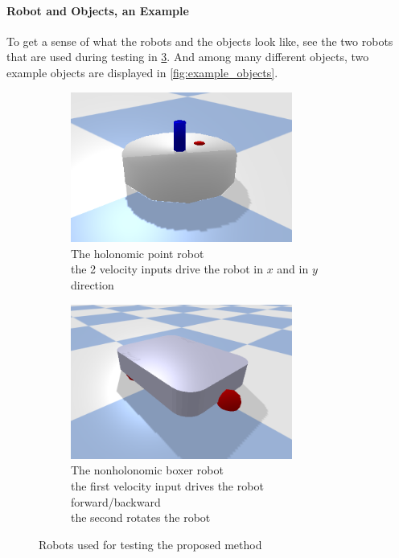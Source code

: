\paragraph{Robot and Objects, an Example}
To get a sense of what the robots and the objects look like, see the two robots that are used during testing in \cref{fig:example_robots}. And among many different objects, two example objects are displayed in \cref{fig:example_objects}.

\begin{figure}[H]
    \centering
    \begin{subfigure}{.5\textwidth}
    \centering
    \includegraphics[width=0.8\textwidth]{figures/point_robot.png}
    \caption{The holonomic point robot\\the 2 velocity inputs drive the robot in $x$ and in $y$ direction}%
    \label{subfig:example_point_robot}
    \end{subfigure}%
    \begin{subfigure}{.5\textwidth}
    \centering
    \includegraphics[width=0.8\textwidth]{figures/boxer_robot.png}
    \caption{The nonholonomic boxer robot\\the first velocity input drives the robot forward/backward\\the second rotates the robot}%
    \label{subfig:example_boxer_robot}
    \end{subfigure}%
    \caption{Robots used for testing the proposed method}%
    \label{fig:example_robots}
\end{figure}

